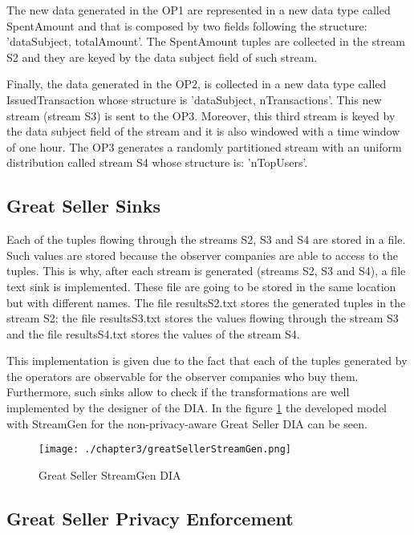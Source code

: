 The new data generated in the OP1 are represented in a new data type called SpentAmount and that is composed by two fields following the structure: 'dataSubject, totalAmount'. The SpentAmount tuples are collected in the stream S2 and they are keyed by the data subject field of such stream.

Finally, the data generated in the OP2, is collected in a new data type called IssuedTransaction whose structure is 'dataSubject, nTransactions'. This new stream (stream S3) is sent to the OP3. Moreover, this third stream is keyed by the data subject field of the stream and it is also windowed with a time window of one hour. The OP3 generates a randomly partitioned stream with an uniform distribution called stream S4 whose structure is: 'nTopUsers'.

\subsection{Great Seller Sinks}

Each of the tuples flowing through the streams S2, S3 and S4 are stored in a file. Such values are stored because the observer companies are able to access to the tuples. This is why, after each stream is generated (streams S2, S3 and S4), a file text sink is implemented. These file are going to be stored in the same location but with different names. The file resultsS2.txt stores the generated tuples in the stream S2; the file resultsS3.txt stores the values flowing through the stream S3 and the file resultsS4.txt stores the values of the stream S4.

This implementation is given due to the fact that each of the tuples generated by the operators are observable for the observer companies who buy them. Furthermore, such sinks allow to check if the transformations are well implemented by the designer of the DIA. In the figure \ref{fig:Great Seller StreamGen DIA} the developed model with StreamGen for the non-privacy-aware Great Seller DIA can be seen.

\begin{figure}
\centering
{\texttt{[image: ./chapter3/greatSellerStreamGen.png]}}
\caption{Great Seller StreamGen DIA}
\label{fig:Great Seller StreamGen DIA}
\end{figure}

\subsection{Great Seller Privacy Enforcement}

